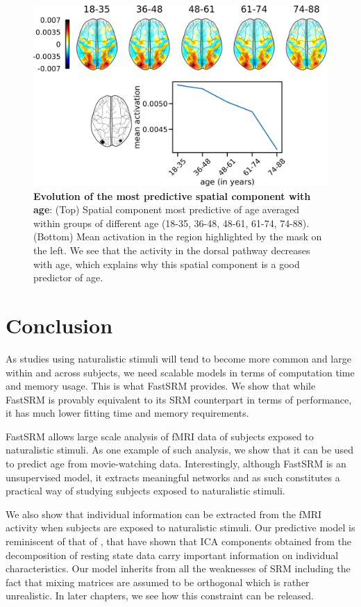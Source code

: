 \begin{figure}
\centering
\includegraphics[scale=0.35]{figures/srm/feature_importance_age_prediction.png}
\caption{\textbf{Evolution of the most predictive spatial component with age}: (Top) Spatial component most predictive of age averaged within groups of different age (18-35, 36-48, 48-61, 61-74, 74-88). (Bottom) Mean activation in the region highlighted by the mask on the left. We see that the activity in the dorsal pathway decreases with age, which explains why this spatial component is a good predictor of age.}
\label{fig:predict_age_interpretation}
\end{figure}



\section{Conclusion}
As studies using naturalistic stimuli will tend to become more common and large
within and across subjects, we need scalable models in terms of computation time
and memory usage.
%
This is what FastSRM provides.
%
We show that while FastSRM is provably equivalent to its SRM counterpart in
terms of performance,  it has much lower fitting time and memory requirements.

FastSRM allows large scale analysis of fMRI data of subjects exposed to naturalistic stimuli. As one example of such analysis, we show that it can be used to predict age from movie-watching data. Interestingly, although FastSRM is an unsupervised model, it extracts meaningful networks and as such constitutes a practical way of studying subjects exposed to naturalistic stimuli.

We also show that individual information can be extracted from the fMRI activity when subjects are exposed to naturalistic stimuli. Our predictive model is reminiscent of that of \cite{bijsterbosch2018relationship}, that have shown that ICA components obtained from the decomposition of resting state data carry important information on individual characteristics. 
%
Our model inherits from all the weaknesses of SRM including the fact that
mixing matrices are assumed to be orthogonal which is rather unrealistic.
In later chapters, we see how this constraint can be released.

